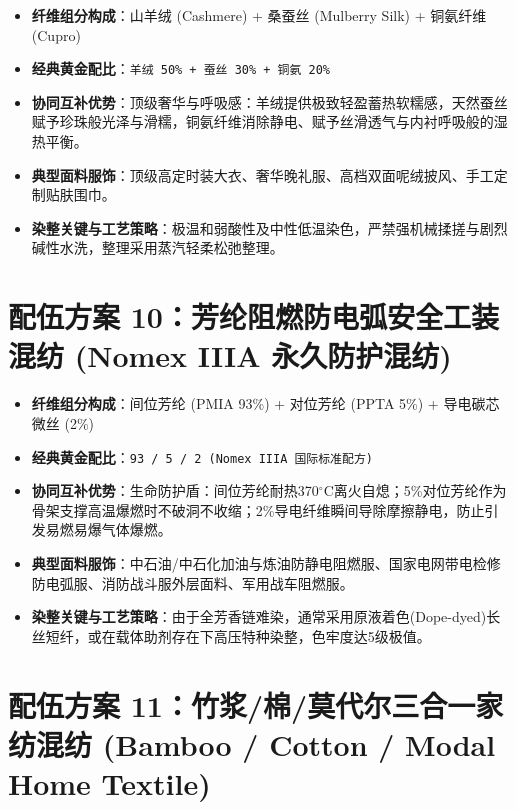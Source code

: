 \documentclass[11pt,openright,twoside,UTF8]{ctexbook}
\begin{document}
\begin{itemize} \setlength{\itemsep}{2.5pt}
    \item \textbf{纤维组分构成}：山羊绒 (Cashmere) + 桑蚕丝 (Mulberry Silk) + 铜氨纤维 (Cupro)
    \item \textbf{经典黄金配比}：\texttt{羊绒 50\% + 蚕丝 30\% + 铜氨 20\%}
    \item \textbf{协同互补优势}：顶级奢华与呼吸感：羊绒提供极致轻盈蓄热软糯感，天然蚕丝赋予珍珠般光泽与滑糯，铜氨纤维消除静电、赋予丝滑透气与内衬呼吸般的湿热平衡。
    \item \textbf{典型面料服饰}：顶级高定时装大衣、奢华晚礼服、高档双面呢绒披风、手工定制贴肤围巾。
    \item \textbf{染整关键与工艺策略}：极温和弱酸性及中性低温染色，严禁强机械揉搓与剧烈碱性水洗，整理采用蒸汽轻柔松弛整理。
\end{itemize}
\vspace{0.3cm}

\section{配伍方案 10：芳纶阻燃防电弧安全工装混纺 (Nomex IIIA 永久防护混纺)}

\begin{itemize} \setlength{\itemsep}{2.5pt}
    \item \textbf{纤维组分构成}：间位芳纶 (PMIA 93\%) + 对位芳纶 (PPTA 5\%) + 导电碳芯微丝 (2\%)
    \item \textbf{经典黄金配比}：\texttt{93 / 5 / 2 (Nomex IIIA 国际标准配方)}
    \item \textbf{协同互补优势}：生命防护盾：间位芳纶耐热370$^\circ\mathrm{C}$离火自熄；5\%对位芳纶作为骨架支撑高温爆燃时不破洞不收缩；2\%导电纤维瞬间导除摩擦静电，防止引发易燃易爆气体爆燃。
    \item \textbf{典型面料服饰}：中石油/中石化加油与炼油防静电阻燃服、国家电网带电检修防电弧服、消防战斗服外层面料、军用战车阻燃服。
    \item \textbf{染整关键与工艺策略}：由于全芳香链难染，通常采用原液着色(Dope-dyed)长丝短纤，或在载体助剂存在下高压特种染整，色牢度达5级极值。
\end{itemize}
\vspace{0.3cm}

\section{配伍方案 11：竹浆/棉/莫代尔三合一家纺混纺 (Bamboo / Cotton / Modal Home Textile)}
\end{document}
